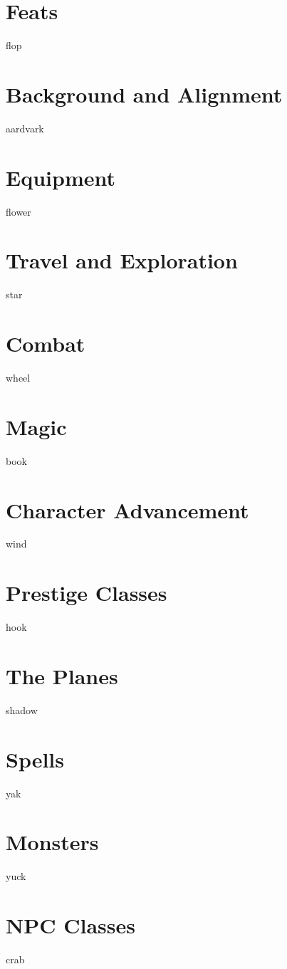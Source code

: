 \documentclass[12pt,twoside,onecolumn,openany,final]{memoir}
\begin{document}
\chapter{Feats}
flop
\chapter{Background and Alignment}
aardvark
\chapter{Equipment}
flower
\chapter{Travel and Exploration}
star
\chapter{Combat}
wheel
\chapter{Magic}
book
\chapter{Character Advancement}
wind
\chapter{Prestige Classes}
hook
\chapter{The Planes}
shadow


\appendix
\appendixpage

\makeatletter
\renewcommand{\@makechapterhead}[1]{%
\vspace*{0 pt}{
\raggedright \normalfont \fontsize{32}{32} \selectfont \bfseries
\ifnum \value{secnumdepth}>-1
  \if@mainmatter \vspace{-8pt} {\fontsize{20}{20} \selectfont Appendix \thechapter:}\\[8pt]
  \fi%
\fi
\hspace{0.65cm} #1\par\nobreak\vspace{20 pt}
}}
\makeatother

\clearpage


\chapter{Spells}
yak
\chapter{Monsters}
yuck
\chapter{NPC Classes}
crab




\clearpage
{}
\listoftables

\clearpage
{}
\printindex
\end{document}
